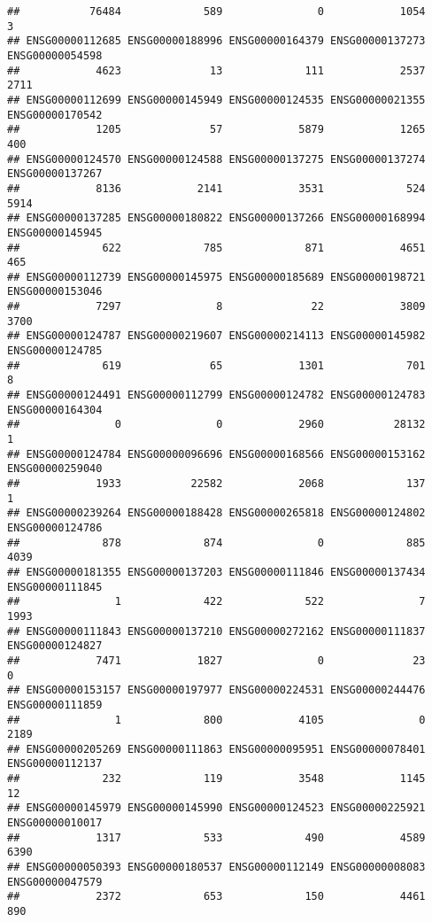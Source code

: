 \documentclass[
]{article}
\begin{document}
\begin{verbatim}
##           76484             589               0            1054               3 
## ENSG00000112685 ENSG00000188996 ENSG00000164379 ENSG00000137273 ENSG00000054598 
##            4623              13             111            2537            2711 
## ENSG00000112699 ENSG00000145949 ENSG00000124535 ENSG00000021355 ENSG00000170542 
##            1205              57            5879            1265             400 
## ENSG00000124570 ENSG00000124588 ENSG00000137275 ENSG00000137274 ENSG00000137267 
##            8136            2141            3531             524            5914 
## ENSG00000137285 ENSG00000180822 ENSG00000137266 ENSG00000168994 ENSG00000145945 
##             622             785             871            4651             465 
## ENSG00000112739 ENSG00000145975 ENSG00000185689 ENSG00000198721 ENSG00000153046 
##            7297               8              22            3809            3700 
## ENSG00000124787 ENSG00000219607 ENSG00000214113 ENSG00000145982 ENSG00000124785 
##             619              65            1301             701               8 
## ENSG00000124491 ENSG00000112799 ENSG00000124782 ENSG00000124783 ENSG00000164304 
##               0               0            2960           28132               1 
## ENSG00000124784 ENSG00000096696 ENSG00000168566 ENSG00000153162 ENSG00000259040 
##            1933           22582            2068             137               1 
## ENSG00000239264 ENSG00000188428 ENSG00000265818 ENSG00000124802 ENSG00000124786 
##             878             874               0             885            4039 
## ENSG00000181355 ENSG00000137203 ENSG00000111846 ENSG00000137434 ENSG00000111845 
##               1             422             522               7            1993 
## ENSG00000111843 ENSG00000137210 ENSG00000272162 ENSG00000111837 ENSG00000124827 
##            7471            1827               0              23               0 
## ENSG00000153157 ENSG00000197977 ENSG00000224531 ENSG00000244476 ENSG00000111859 
##               1             800            4105               0            2189 
## ENSG00000205269 ENSG00000111863 ENSG00000095951 ENSG00000078401 ENSG00000112137 
##             232             119            3548            1145              12 
## ENSG00000145979 ENSG00000145990 ENSG00000124523 ENSG00000225921 ENSG00000010017 
##            1317             533             490            4589            6390 
## ENSG00000050393 ENSG00000180537 ENSG00000112149 ENSG00000008083 ENSG00000047579 
##            2372             653             150            4461             890 

\end{verbatim}
\end{document}

